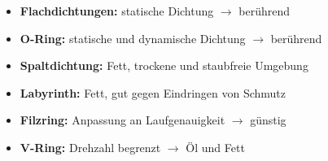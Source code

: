 \begin{scriptsize}
    \begin{itemize}
        \item \textbf{Flachdichtungen:} statische Dichtung $\to$ berührend
        \item \textbf{O-Ring:} statische und dynamische Dichtung $\to$ berührend
        \item \textbf{Spaltdichtung:} Fett, trockene und staubfreie Umgebung
        \item \textbf{Labyrinth:} Fett, gut gegen Eindringen von Schmutz
        \item \textbf{Filzring:} Anpassung an Laufgenauigkeit $\to$ günstig
        \item \textbf{V-Ring:} Drehzahl begrenzt $\to$ Öl und Fett
    \end{itemize}
\end{scriptsize}